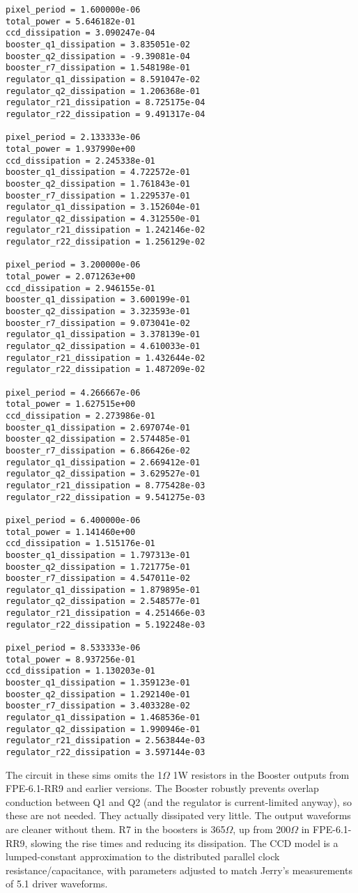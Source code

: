 \documentclass[12pt]{report}
\begin{document}
\begin{verbatim}
pixel_period = 1.600000e-06
total_power = 5.646182e-01
ccd_dissipation = 3.090247e-04
booster_q1_dissipation = 3.835051e-02
booster_q2_dissipation = -9.39081e-04
booster_r7_dissipation = 1.548198e-01
regulator_q1_dissipation = 8.591047e-02
regulator_q2_dissipation = 1.206368e-01
regulator_r21_dissipation = 8.725175e-04
regulator_r22_dissipation = 9.491317e-04
 
pixel_period = 2.133333e-06
total_power = 1.937990e+00
ccd_dissipation = 2.245338e-01
booster_q1_dissipation = 4.722572e-01
booster_q2_dissipation = 1.761843e-01
booster_r7_dissipation = 1.229537e-01
regulator_q1_dissipation = 3.152604e-01
regulator_q2_dissipation = 4.312550e-01
regulator_r21_dissipation = 1.242146e-02
regulator_r22_dissipation = 1.256129e-02
 
pixel_period = 3.200000e-06
total_power = 2.071263e+00
ccd_dissipation = 2.946155e-01
booster_q1_dissipation = 3.600199e-01
booster_q2_dissipation = 3.323593e-01
booster_r7_dissipation = 9.073041e-02
regulator_q1_dissipation = 3.378139e-01
regulator_q2_dissipation = 4.610033e-01
regulator_r21_dissipation = 1.432644e-02
regulator_r22_dissipation = 1.487209e-02
 
pixel_period = 4.266667e-06
total_power = 1.627515e+00
ccd_dissipation = 2.273986e-01
booster_q1_dissipation = 2.697074e-01
booster_q2_dissipation = 2.574485e-01
booster_r7_dissipation = 6.866426e-02
regulator_q1_dissipation = 2.669412e-01
regulator_q2_dissipation = 3.629527e-01
regulator_r21_dissipation = 8.775428e-03
regulator_r22_dissipation = 9.541275e-03
 
pixel_period = 6.400000e-06
total_power = 1.141460e+00
ccd_dissipation = 1.515176e-01
booster_q1_dissipation = 1.797313e-01
booster_q2_dissipation = 1.721775e-01
booster_r7_dissipation = 4.547011e-02
regulator_q1_dissipation = 1.879895e-01
regulator_q2_dissipation = 2.548577e-01
regulator_r21_dissipation = 4.251466e-03
regulator_r22_dissipation = 5.192248e-03
 
pixel_period = 8.533333e-06
total_power = 8.937256e-01
ccd_dissipation = 1.130203e-01
booster_q1_dissipation = 1.359123e-01
booster_q2_dissipation = 1.292140e-01
booster_r7_dissipation = 3.403328e-02
regulator_q1_dissipation = 1.468536e-01
regulator_q2_dissipation = 1.990946e-01
regulator_r21_dissipation = 2.563844e-03
regulator_r22_dissipation = 3.597144e-03
\end{verbatim}

The circuit in these sims omits the 1$\Omega$ 1W resistors in the Booster outputs from FPE-6.1-RR9 and earlier versions. The Booster robustly prevents overlap conduction between Q1 and Q2 (and the regulator is current-limited anyway), so these are not needed. They actually dissipated very little. The output waveforms are cleaner without them. R7 in the boosters is 365$\Omega$, up from 200$\Omega$ in FPE-6.1-RR9, slowing the rise times and reducing its dissipation. The CCD model is a lumped-constant approximation to the distributed parallel clock resistance/capacitance, with parameters adjusted to match Jerry's measurements of 5.1 driver waveforms. 
\end{document}
